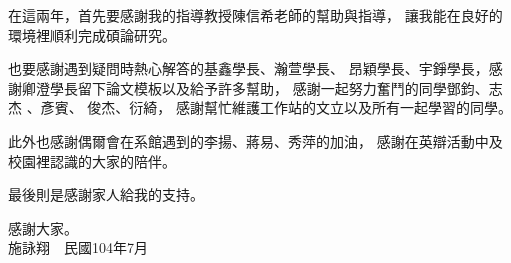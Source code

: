 \begin{acknowledgementszh}

在這兩年，首先要感謝我的指導教授陳信希老師的幫助與指導，
讓我能在良好的環境裡順利完成碩論研究。

也要感謝遇到疑問時熱心解答的基鑫學長、瀚萱學長、
昂穎學長、宇錚學長，感謝卿澄學長留下論文模板以及給予許多幫助，
感謝一起努力奮鬥的同學鄧鈞、志杰 、彥賓、 俊杰、衍綺，
感謝幫忙維護工作站的文立以及所有一起學習的同學。

此外也感謝偶爾會在系館遇到的李揚、蔣易、秀萍的加油，
感謝在英辯活動中及校園裡認識的大家的陪伴。

最後則是感謝家人給我的支持。


感謝大家。\\

\hfill 施詠翔\ \ 民國104年7月

\end{acknowledgementszh}

